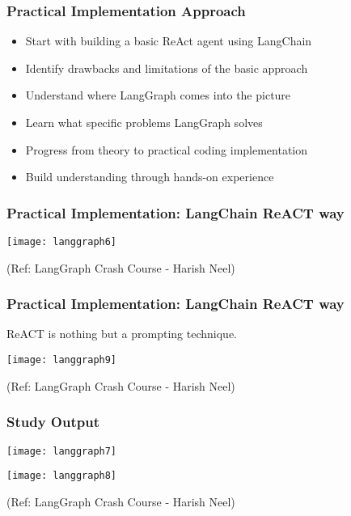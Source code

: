 \begin{frame}[fragile]\frametitle{Practical Implementation Approach}
      \begin{itemize}
        \item Start with building a basic ReAct agent using LangChain
        \item Identify drawbacks and limitations of the basic approach
        \item Understand where LangGraph comes into the picture
        \item Learn what specific problems LangGraph solves
        \item Progress from theory to practical coding implementation
        \item Build understanding through hands-on experience
      \end{itemize}
\end{frame}

\begin{frame}[fragile]\frametitle{Practical Implementation: LangChain ReACT way}

\begin{center}
\texttt{[image: langgraph6]}


{\tiny (Ref: LangGraph Crash Course - Harish Neel)}

\end{center}	  

\end{frame}

\begin{frame}[fragile]\frametitle{Practical Implementation: LangChain ReACT way}

ReACT is nothing but a prompting technique.

\begin{center}
\texttt{[image: langgraph9]}


{\tiny (Ref: LangGraph Crash Course - Harish Neel)}

\end{center}	  

\end{frame}

\begin{frame}[fragile]\frametitle{Study Output}

\begin{center}
\texttt{[image: langgraph7]}

\texttt{[image: langgraph8]}

{\tiny (Ref: LangGraph Crash Course - Harish Neel)}

\end{center}	  

\end{frame}


